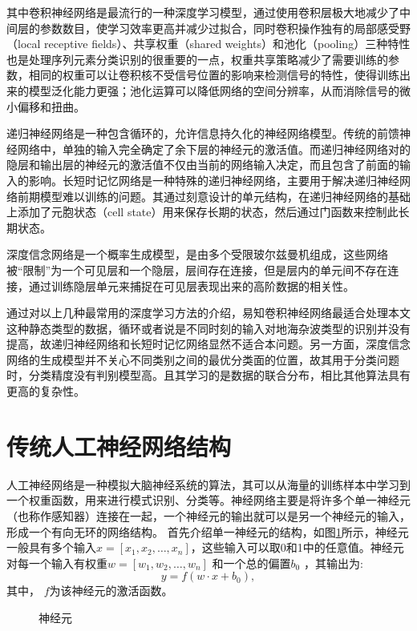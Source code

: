 其中卷积神经网络是最流行的一种深度学习模型，通过使用卷积层极大地减少了中间层的参数数目，使学习效率更高并减少过拟合，同时卷积操作独有的局部感受野（local receptive fields）、共享权重（shared weights）和池化（pooling）三种特性也是处理序列元素分类识别的很重要的一点，权重共享策略减少了需要训练的参数，相同的权重可以让卷积核不受信号位置的影响来检测信号的特性，使得训练出来的模型泛化能力更强；池化运算可以降低网络的空间分辨率，从而消除信号的微小偏移和扭曲。

递归神经网络是一种包含循环的，允许信息持久化的神经网络模型。传统的前馈神经网络中，单独的输入完全确定了余下层的神经元的激活值。而递归神经网络对的隐层和输出层的神经元的激活值不仅由当前的网络输入决定，而且包含了前面的输入的影响。长短时记忆网络是一种特殊的递归神经网络，主要用于解决递归神经网络前期模型难以训练的问题。其通过刻意设计的单元结构，在递归神经网络的基础上添加了元胞状态（cell state）用来保存长期的状态，然后通过门函数来控制此长期状态。

深度信念网络是一个概率生成模型，是由多个受限玻尔兹曼机组成，这些网络被“限制”为一个可见层和一个隐层，层间存在连接，但是层内的单元间不存在连接，通过训练隐层单元来捕捉在可见层表现出来的高阶数据的相关性。

通过对以上几种最常用的深度学习方法的介绍，易知卷积神经网络最适合处理本文这种静态类型的数据，循环或者说是不同时刻的输入对地海杂波类型的识别并没有提高，故递归神经网络和长短时记忆网络显然不适合本问题。另一方面，深度信念网络的生成模型并不关心不同类别之间的最优分类面的位置，故其用于分类问题时，分类精度没有判别模型高。且其学习的是数据的联合分布，相比其他算法具有更高的复杂性。

\section{传统人工神经网络结构}
\label{sec:neural}
人工神经网络是一种模拟大脑神经系统的算法，其可以从海量的训练样本中学习到一个权重函数，用来进行模式识别、分类等。神经网络主要是将许多个单一神经元（也称作感知器）连接在一起，一个神经元的输出就可以是另一个神经元的输入，形成一个有向无环的网络结构。
首先介绍单一神经元的结构，如图\ref{fig:neural}所示，神经元一般具有多个输入$x=[x_1,x_2,\dots,x_n] $，这些输入可以取0和1中的任意值。神经元对每一个输入有权重$w=[w_1,w_2,\dots,w_n] $ 和一个总的偏置$b_0$ ，其输出为:
\begin{equation}
y = f(w\cdot x + b_0),
\label{equ:neural}
\end{equation}
其中， $f$为该神经元的激活函数。

\begin{figure}[hbt]
  \centering   \sWuhao
  
  \caption{神经元}
  \label{fig:neural}
\end{figure}


